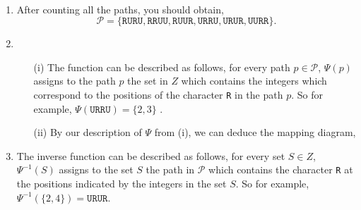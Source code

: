 \documentclass[12pt]{article} %
\begin{document}
\begin{solution} \texttt{  }
  \begin{enumerate}[label=(\alph*)]
    \item After counting all the paths, you should obtain,
      \[
          \mathcal{P} = \{\texttt{RURU}, \texttt{RRUU}, \texttt{RUUR}, \texttt{URRU}, \texttt{URUR}, \texttt{UURR}\} 
      .\] 
    \item 
      \begin{enumerate}[label=(\alph*)]
        \item[(i)] The function can be described as follows, for every path  $p \in \mathcal{P}$, $\Psi(p)$ assigns
          to the path $p$ the set in $Z$ which contains the integers which correspond to the positions of the
          character \texttt{R} in the path $p$. So for example, $\Psi(\texttt{URRU}) = \{2,3\} $ .
        \item[(ii)] By our description of $\Psi$ from (i), we can deduce the mapping diagram,

          \begin{center}
        \end{center}

      \end{enumerate}
    \item The inverse function can be described as follows, for every set  $S \in Z$, $\Psi^{-1}(S)$ assigns
          to the set $S$ the path in $\mathcal{P}$ which contains the character \texttt{R} at the positions
          indicated by the integers in the set $S$. So for example, $\Psi^{-1}(\{2,4\} ) = \texttt{URUR}$.
  \end{enumerate}
\end{solution}
\end{document}
